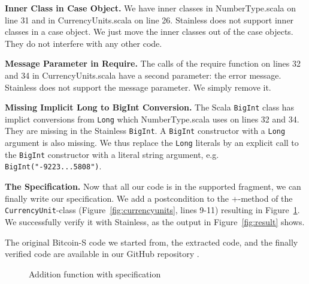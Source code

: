 \documentclass[hyphens, a4paper,USenglish,cleveref, autoref, thm-restate]{oasics-v2019}
\renewcommand{\paragraph}{\textbf}%
\begin{document}
\paragraph{Inner Class in Case Object.} We have inner classes in
NumberType.scala on line 31 and in CurrencyUnits.scala on line
26. Stainless does not support inner classes in a case object. We just
move the inner classes out of the case objects. They do not interfere
with any other code.

\paragraph{Message Parameter in Require.} The calls of the require
function on lines 32 and 34 in CurrencyUnits.scala have a second
parameter: the error message. Stainless does not support the message
parameter. We simply remove it.

\paragraph{Missing Implicit Long to BigInt Conversion.} The Scala
\texttt{BigInt} class has implict conversions from \texttt{Long} which
NumberType.scala uses on lines 32 and 34. They are missing in the
Stainless \texttt{BigInt}. A \texttt{BigInt} constructor with a
\texttt{Long} argument is also missing. We thus replace the
\texttt{Long} literals by an explicit call to the \texttt{BigInt}
constructor with a literal string argument,
e.g. \texttt{BigInt("-9223...5808")}.


\paragraph{The Specification.} Now that all our code is in the
supported fragment, we can finally write our specification. We add a
postcondition to the +-method of the \texttt{CurrencyUnit}-class
(Figure~\ref{fig:currencyunits}, lines 9-11) resulting in
Figure~\ref{fig:spec}. We successfully verify it with Stainless, as
the output in Figure~\ref{fig:result} shows.

The original Bitcoin-S code we started from, the extracted code, and
the finally verified code are available in our GitHub repository \cite{verification:github}.

\begin{figure}
  
\caption{Addition function with specification}
\label{fig:spec}
\end{figure}
\end{document}
